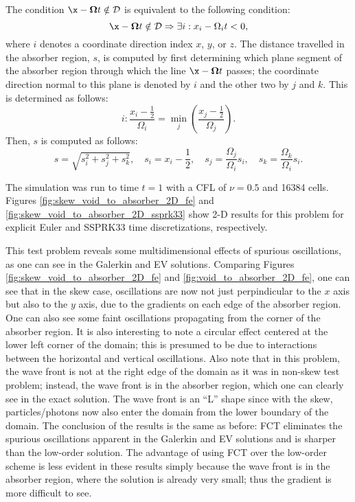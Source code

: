 The condition $\x-\mathbf{\Omega}t\notin\mathcal{D}$ is equivalent to the
following condition:
\[
   \x-\mathbf{\Omega}t\notin\mathcal{D} \Rightarrow
   \exists i: x_i-\Omega_i t < 0,
\]
where $i$ denotes a coordinate direction index $x$, $y$, or $z$.
The distance travelled in the absorber region, $s$, is computed
by first determining which plane segment of the absorber region
through which the line $\x-\mathbf{\Omega}t$ passes; the coordinate
direction normal to this plane is denoted by $i$ and the other
two by $j$ and $k$. This is determined as follows:
\[
   i: \frac{x_i-\frac{1}{2}}{\Omega_i} = \min\limits_j\left(
      \frac{x_j-\frac{1}{2}}{\Omega_j}\right).
\]
Then, $s$ is computed as follows:
\begin{equation}\label{eq:s_distance}
   s=\sqrt{s_i^2 + s_j^2 + s_k^2}, \quad
   s_i=x_i-\frac{1}{2}, \quad
   s_j=\frac{\Omega_j}{\Omega_i}s_i, \quad
   s_k=\frac{\Omega_k}{\Omega_i}s_i.
\end{equation}

The simulation was run to time $t=1$ with a CFL of $\nu=0.5$ and 16384 cells.
Figures \ref{fig:skew_void_to_absorber_2D_fe} and
\ref{fig:skew_void_to_absorber_2D_ssprk33} show 2-D results for this problem
for explicit Euler and SSPRK33 time discretizations, respectively.

This test problem reveals some multidimensional effects of spurious
oscillations, as one can see in the Galerkin and EV solutions. Comparing
Figures \ref{fig:skew_void_to_absorber_2D_fe} and \ref{fig:void_to_absorber_2D_fe},
one can see that in the skew case, oscillations are now not just perpindicular
to the $x$ axis but also to the $y$ axis, due to the gradients on each
edge of the absorber region. One can also see some faint oscillations
propagating from the corner of the absorber region. It is also interesting
to note a circular effect centered at the lower left corner of the domain;
this is presumed to be due to interactions between the horizontal and
vertical oscillations. Also note that in this problem, the wave front
is not at the right edge of the domain as it was in non-skew test
problem; instead, the wave front is in the absorber region, which
one can clearly see in the exact solution. The wave front is an ``L''
shape since with the skew, particles/photons now also enter the domain
from the lower boundary of the domain. The conclusion of the results
is the same as before: FCT eliminates the spurious oscillations apparent
in the Galerkin and EV solutions and is sharper than the low-order
solution. The advantage of using FCT over the low-order scheme is
less evident in these results simply because the wave front is
in the absorber region, where the solution is already very small;
thus the gradient is more difficult to see.

